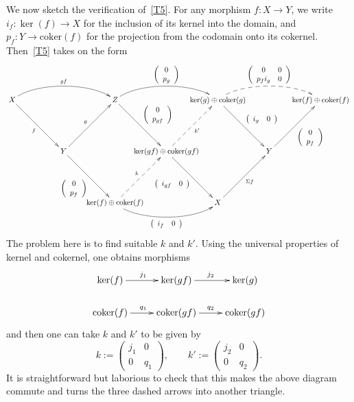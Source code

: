 \documentclass{amsproc}
\theoremstyle{definition}
\begin{document}
We now sketch the verification of~\ref{T5}. For any morphism $f :  X{\longrightarrow} Y$, we write $i_f  : \ker(f){\longrightarrow} X$ for the inclusion of its kernel into the domain, and $p_f  : Y{\longrightarrow} {\mathrm{coker}}(f)$ for the projection from the codomain onto its cokernel. Then~\ref{T5} takes on the form
\[
\xymatrix@!@-4pc{ X \ar@(ru,lu)[rr]^{gf}\ar[rd]_f & & Z \ar@(ru,lu)[rr]^{\left(\begin{array}{c} 0\\ p_g\end{array}\right)} \ar[rd]^{\left(\begin{array}{c} 0\\ p_{gf}\end{array}\right)} & & \ker(g)\oplus{\mathrm{coker}}(g) \ar@(ru,lu)@{-->}[rr]^{\left(\begin{array}{cc} 0 & 0\\ p_f i_g & 0 \end{array}\right)} \ar[rd]^{\left(\begin{array}{cc}i_g & 0\end{array}\right)} & & \ker(f)\oplus{\mathrm{coker}}(f) \\
& Y \ar[ur]^g \ar[rd]_{\left(\begin{array}{c} 0\\ p_f\end{array}\right)} & & \ker(gf)\oplus{\mathrm{coker}}(gf) \ar@{-->}[ru]_{k'} \ar[rd]_{\left(\begin{array}{cc} i_{gf} & 0\end{array}\right)} & & Y \ar[ru]_{\left(\begin{array}{c} 0 \\ p_f \end{array}\right)} &\\
& & \ker(f)\oplus{\mathrm{coker}}(f) \ar@(rd,ld)[rr]_{\left(\begin{array}{cc} i_f & 0 \end{array}\right)} \ar@{-->}[ru]^{k} & & X \ar[ru]_{\Sigma f} & &}
\]
The problem here is to find suitable $k$ and $k'$. Using the universal properties of kernel and cokernel, one obtains morphisms
\[
\xymatrix@R-6pt{ \ker(f) \ar[r]^{j_1} & \ker(gf)   \ar[r]^{j_2} &   \ker(g) \\
 	 {\mathrm{coker}}(f) \ar[r]^{q_1} & {\mathrm{coker}}(gf) \ar[r]^{q_2} & {\mathrm{coker}}(gf) }
\]
and then one can take $k$ and $k'$ to be given by
\[
k:=\left(\begin{array}{cc} j_1 & 0 \\ 0 & q_1 \end{array}\right),\qquad k':=\left(\begin{array}{cc} j_2 & 0 \\ 0 & q_2 \end{array}\right).
\]
It is straightforward but laborious to check that this makes the above diagram commute and turns the three dashed arrows into another triangle.
\end{document}
